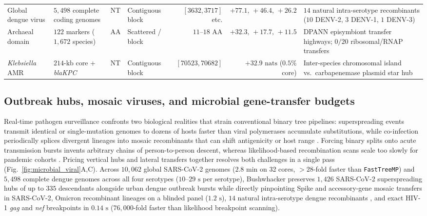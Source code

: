 \documentclass[11pt,a4paper]{article}
\begin{document}
\begin{table}[t!]
{\begin{tabular}{@{}llllrrl@{}}
Global dengue virus & $5,498$ complete coding genomes & NT & Contiguous block & $[3632, 3717]$ etc. & $+77.1,\,+46.4,\,+26.2$ & $14$ natural intra-serotype recombinants ($10$ DENV-2, $3$ DENV-1, $1$ DENV-3) \\
Archaeal domain & $122$ markers ($1,672$ species) & AA & Scattered / block & $11\text{--}18$ AA & $+32.3,\,+17.7,\,+11.5$ & DPANN episymbiont transfer highways; $0/20$ ribosomal/RNAP transfers \\
\textit{Klebsiella} AMR & $214\text{-kb}$ core + \textit{blaKPC} & NT & Contiguous block & $[70523, 70682]$ & $+32.9\text{ nats}$ ($0.5\%$ core) & Inter-species chromosomal island vs.\ carbapenemase plasmid star hub \\
\bottomrule
\end{tabular}%
}
\end{table}

\subsection*{Outbreak hubs, mosaic viruses, and microbial gene-transfer budgets}

Real-time pathogen surveillance confronts two biological realities that strain conventional binary tree pipelines: superspreading events transmit identical or single-mutation genomes to dozens of hosts faster than viral polymerases accumulate substitutions, while co-infection periodically splices divergent lineages into mosaic recombinants that can shift antigenicity or host range \citep{worobey1999widespread,turakhia2022pandemic}. Forcing binary splits onto acute transmission bursts invents arbitrary chains of person-to-person descent, whereas likelihood-based recombination scans scale too slowly for pandemic cohorts \citep{kosakovskypond2006gard}. Pricing vertical hubs and lateral transfers together resolves both challenges in a single pass (Fig.~\ref{fig:microbial_viral}A,C). Across $10,062$ global SARS-CoV-2 genomes ($2.8\text{ min}$ on 32 cores, $>28$-fold faster than \texttt{FastTreeMP}) and $5,498$ complete dengue genomes across all four serotypes ($10\text{--}29\text{ s}$ per serotype), Bushwhacker preserves $1,426$ SARS-CoV-2 superspreading hubs of up to $335$ descendants alongside urban dengue outbreak bursts while directly pinpointing Spike and accessory-gene mosaic transfers in SARS-CoV-2, Omicron recombinant lineages on a blinded panel ($1.2\text{ s}$), $14$ natural intra-serotype dengue recombinants \citep{worobey1999widespread}, and exact HIV-1 \textit{gag} and \textit{nef} breakpoints \citep{carr1998full} in $0.14\text{ s}$ ($76,000$-fold faster than likelihood breakpoint scanning).
\end{document}
